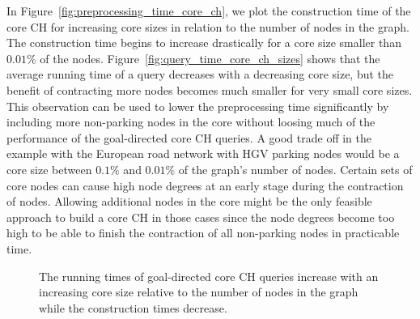 In Figure~\ref{fig:preprocessing_time_core_ch}, we plot the construction time of the core CH for increasing core sizes in relation to the number of nodes in the graph. The construction time begins to increase drastically for a core size smaller than $0.01\%$ of the nodes. Figure~\ref{fig:query_time_core_ch_sizes} shows that the average running time of a query decreases with a decreasing core size, but the benefit of contracting more nodes becomes much smaller for very small core sizes. This observation can be used to lower the preprocessing time significantly by including more non-parking nodes in the core without loosing much of the performance of the goal-directed core CH queries. A good trade off in the example with the European road network with HGV parking nodes would be a core size between $0.1\%$ and $0.01\%$ of the graph's number of nodes. Certain sets of core nodes can cause high node degrees at an early stage during the contraction of nodes. Allowing additional nodes in the core might be the only feasible approach to build a core CH in those cases since the node degrees become too high to be able to finish the contraction of all non-parking nodes in practicable time.

\begin{figure}[hbtp]
	\centering
	\hfill
	\caption{The running times of goal-directed core CH queries increase with an increasing core size relative to the number of nodes in the graph while the construction times decrease.}
	\label{fig:core_ch_sizes}
\end{figure}